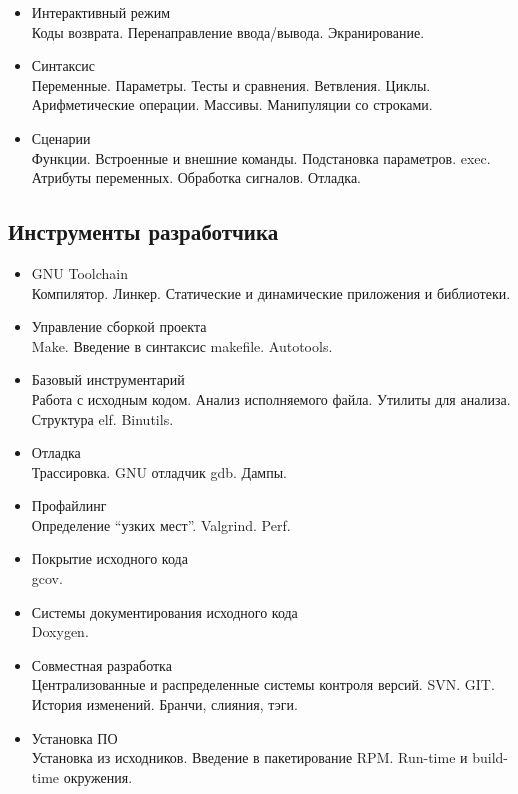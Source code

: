 \documentclass[12pt,a4paper,oneside]{article}
\begin{document}
\begin{itemize}
    \item Интерактивный режим \\
        Коды возврата. Перенаправление ввода/вывода.  Экранирование.
    \item Синтаксис \\
        Переменные. Параметры. Тесты и сравнения. Ветвления. Циклы. Арифметические операции. Массивы. Манипуляции со строками.
    \item Сценарии \\
        Функции. Встроенные и внешние команды. Подстановка параметров. exec. Атрибуты переменных. Обработка сигналов. Отладка.
\end{itemize}

\subsection{Инструменты разработчика}
\begin{itemize}
    \item GNU Toolchain \\
        Компилятор. Линкер. Статические и динамические приложения и библиотеки.
    \item Управление сборкой проекта \\
        Make. Введение в синтаксис makefile. Autotools.
    \item Базовый инструментарий \\
        Работа с исходным кодом. Анализ исполняемого файла. Утилиты для анализа. Структура elf. Binutils.
    \item Отладка \\
        Трассировка. GNU отладчик gdb. Дампы.
    \item Профайлинг \\
        Определение ``узких мест''. Valgrind. Perf.
    \item Покрытие исходного кода \\
        gcov.
    \item Системы документирования исходного кода \\
        Doxygen.
    \item Совместная разработка \\
        Централизованные и распределенные системы контроля версий. SVN. GIT. История изменений. Бранчи, слияния, тэги.
    \item Установка ПО \\
        Установка из исходников. Введение в пакетирование RPM. Run-time и build-time окружения.
\end{itemize}
\end{document}
